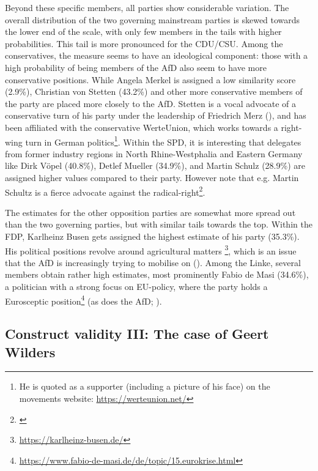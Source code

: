 \documentclass{article}
\begin{document}
Beyond these specific members, all parties show considerable variation. The overall distribution of the two governing mainstream parties is skewed towards the lower end of the scale, with only few members in the tails with higher probabilities. This tail is more pronounced for the CDU/CSU. Among the conservatives, the measure seems to have an ideological component: those with a high probability of being members of the AfD also seem to have more conservative positions. While Angela Merkel is assigned a low similarity score (2.9\%), Christian von Stetten (43.2\%) and other more conservative members of the party are placed more closely to the AfD. Stetten is a vocal advocate of a conservative turn of his party under the leadership of Friedrich Merz (\cite{Weinzierler2019}), and has been affiliated with the conservative WerteUnion, which works towards a right-wing turn in German politics\footnote{He is quoted as a supporter (including a picture of his face) on the movements website: \url{https://werteunion.net/}}. Within the SPD, it is interesting that delegates from former industry regions in North Rhine-Westphalia and Eastern Germany like Dirk Vöpel (40.8\%), Detlef Mueller (34.9\%), and Martin Schulz (28.9\%) are assigned higher values compared to their party. However note that e.g. Martin Schultz is a fierce advocate against the radical-right\footnote{\cite{Tagesspiegel2018Schulz}}.\par

The estimates for the other opposition parties are somewhat more spread out than the two governing parties, but with similar tails towards the top. Within the FDP, Karlheinz Busen gets assigned the highest estimate of his party (35.3\%). His political positions revolve around agricultural matters \footnote{\url{https://karlheinz-busen.de/}}, which is an issue that the AfD is increasingly trying to mobilise on (\cite{Sueddeutsche2020AfD}).  Among the Linke, several members obtain rather high estimates, most prominently Fabio de Masi (34.6\%), a politician with a strong focus on EU-policy, where the party holds a Eurosceptic position\footnote{\url{https://www.fabio-de-masi.de/de/topic/15.eurokrise.html}} (as does the AfD; \cite{ThePopulist2019}).\par


\subsection{Construct validity III: The case of Geert Wilders}
\end{document}
